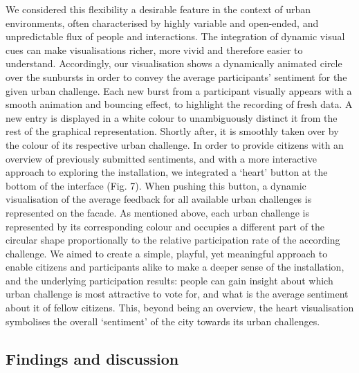 We considered this flexibility a desirable feature in the context of urban environments,
often characterised by highly variable and open-ended, and unpredictable
flux of people and interactions. The integration of dynamic visual cues can make
visualisations richer, more vivid and therefore easier to understand. Accordingly,
our visualisation shows a dynamically animated circle over the sunbursts in order
to convey the average participants’ sentiment for the given urban challenge. Each
new burst from a participant visually appears with a smooth animation and bouncing
effect, to highlight the recording of fresh data. A new entry is displayed in a
white colour to unambiguously distinct it from the rest of the graphical representation.
Shortly after, it is smoothly taken over by the colour of its respective urban
challenge. In order to provide citizens with an overview of previously submitted
sentiments, and with a more interactive approach to exploring the installation, we
integrated a ‘heart’ button at the bottom of the interface (Fig. 7). When pushing
this button, a dynamic visualisation of the average feedback for all available urban
challenges is represented on the facade. As mentioned above, each urban challenge
is represented by its corresponding colour and occupies a different part of the circular
shape proportionally to the relative participation rate of the according challenge.
We aimed to create a simple, playful, yet meaningful approach to enable
citizens and participants alike to make a deeper sense of the installation, and the
underlying participation results: people can gain insight about which urban challenge
is most attractive to vote for, and what is the average sentiment about it of
fellow citizens. This, beyond being an overview, the heart visualisation symbolises
the overall ‘sentiment’ of the city towards its urban challenges.

\subsection{Findings and discussion}

